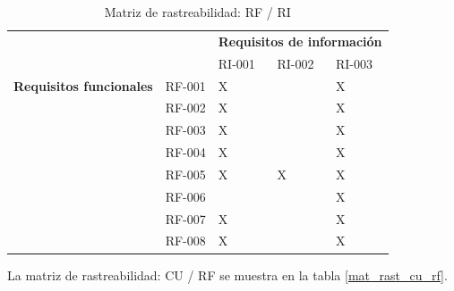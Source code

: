 \begin{table}[htpb]
\centering
\begin{tabular}{|l|l|l|l|l|}
\hline
\multicolumn{2}{|l|}{\multirow{2}{*}{}} & \multicolumn{3}{l|}{\textbf{Requisitos de información}} \\ \cline{3-5} 
\multicolumn{2}{|l|}{}                  & RI-001         & RI-002        & RI-003        \\ \hline
\textbf{Requisitos funcionales}     & RF-001     & X              &               & X             \\ \hline
\multirow{7}{*}{}          & RF-002     & X              &               & X             \\ \cline{2-5} 
                           & RF-003     & X              &               & X             \\ \cline{2-5} 
                           & RF-004     & X              &               & X             \\ \cline{2-5} 
                           & RF-005     & X              & X             & X             \\ \cline{2-5} 
                           & RF-006     &                &               & X             \\ \cline{2-5} 
                           & RF-007     & X              &               & X             \\ \cline{2-5} 
                           & RF-008     & X              &               & X             \\ \hline
\end{tabular}
\caption{Matriz de rastreabilidad: RF / RI}
\label{mat_rast_rf_ri}
\end{table}


La matriz de rastreabilidad: CU / RF se muestra en la tabla \ref{mat_rast_cu_rf}.

